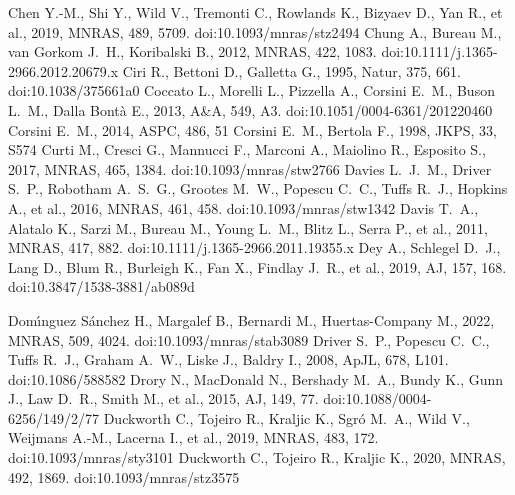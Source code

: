 \documentclass[fleqn,usenatbib]{mnras}
\begin{document}
\begin{thebibliography}{}
 Chen Y.-M., Shi Y., Wild V., Tremonti C., Rowlands K., Bizyaev D., Yan R., et al., 2019, MNRAS, 489, 5709. doi:10.1093/mnras/stz2494
 Chung A., Bureau M., van Gorkom J.~H., Koribalski B., 2012, MNRAS, 422, 1083. doi:10.1111/j.1365-2966.2012.20679.x
 Ciri R., Bettoni D., Galletta G., 1995, Natur, 375, 661. doi:10.1038/375661a0
 Coccato L., Morelli L., Pizzella A., Corsini E.~M., Buson L.~M., Dalla Bont{\`a} E., 2013, A\&A, 549, A3. doi:10.1051/0004-6361/201220460
 Corsini E.~M., 2014, ASPC, 486, 51
 Corsini E.~M., Bertola F., 1998, JKPS, 33, S574
 Curti M., Cresci G., Mannucci F., Marconi A., Maiolino R., Esposito S., 2017, MNRAS, 465, 1384. doi:10.1093/mnras/stw2766
 Davies L.~J.~M., Driver S.~P., Robotham A.~S.~G., Grootes M.~W., Popescu C.~C., Tuffs R.~J., Hopkins A., et al., 2016, MNRAS, 461, 458. doi:10.1093/mnras/stw1342
 Davis T.~A., Alatalo K., Sarzi M., Bureau M., Young L.~M., Blitz L., Serra P., et al., 2011, MNRAS, 417, 882. doi:10.1111/j.1365-2966.2011.19355.x
 Dey A., Schlegel D.~J., Lang D., Blum R., Burleigh K., Fan X., Findlay J.~R., et al., 2019, AJ, 157, 168. doi:10.3847/1538-3881/ab089d

 Dom{\'\i}nguez S{\'a}nchez H., Margalef B., Bernardi M., Huertas-Company M., 2022, MNRAS, 509, 4024. doi:10.1093/mnras/stab3089
 Driver S.~P., Popescu C.~C., Tuffs R.~J., Graham A.~W., Liske J., Baldry I., 2008, ApJL, 678, L101. doi:10.1086/588582
 Drory N., MacDonald N., Bershady M.~A., Bundy K., Gunn J., Law D.~R., Smith M., et al., 2015, AJ, 149, 77. doi:10.1088/0004-6256/149/2/77
 Duckworth C., Tojeiro R., Kraljic K., Sgr{\'o} M.~A., Wild V., Weijmans A.-M., Lacerna I., et al., 2019, MNRAS, 483, 172. doi:10.1093/mnras/sty3101
 Duckworth C., Tojeiro R., Kraljic K., 2020, MNRAS, 492, 1869. doi:10.1093/mnras/stz3575



\end{thebibliography}
\end{document}
